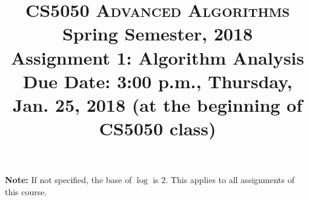 \documentclass[11pt]{article}
\begin{document}
\baselineskip=14.0pt

\title{CS5050 \textsc{Advanced Algorithms}
\\{\Large Spring Semester, 2018}
\\ Assignment 1: Algorithm Analysis
\\ {\large {\bf Due Date:} {\bf 3:00 p.m.}, Thursday, Jan. 25, 2018 ({\bf at the beginning of CS5050 class})}}
\date{}


\maketitle

\vspace{-0.5in}

{\bf Note:} If not specified, the base of $\log$ is $2$. This applies to all assignments of this course.
\end{document}
